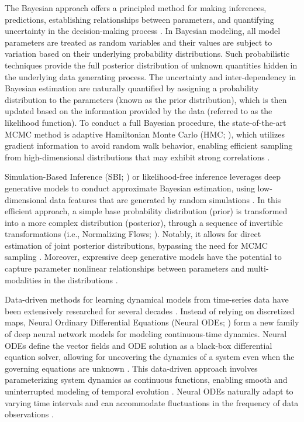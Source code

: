 \documentclass[preprint,11pt,authoryear]{elsarticle}
\begin{document}
The Bayesian approach offers a principled method for making inferences, predictions, establishing relationships between parameters, and quantifying uncertainty in the decision-making process \citep{BDA, Bishop, Gelman2020, VanSchoot2021}. In Bayesian modeling, all model parameters are treated as random variables and their values are subject to variation based on their underlying probability distributions. Such probabilistic techniques provide the full posterior distribution of unknown quantities hidden in the underlying data generating process. The uncertainty and inter-dependency in Bayesian estimation are naturally quantified by assigning a probability distribution to the parameters (known as the prior distribution), which is then updated based on the information provided by the data (referred to as the likelihood function). To conduct a full Bayesian procedure, the state-of-the-art MCMC method is adaptive Hamiltonian Monte Carlo (HMC; \cite{Duane1987, Neal2010, Hoffman2014}), which utilizes gradient information to avoid random walk behavior, enabling efficient sampling from high-dimensional distributions that may exhibit strong correlations \citep{Betancourt2017}.



Simulation-Based Inference (SBI; \cite{Cranmer2020, Brehmer2021}) or likelihood-free inference \citep{Papamakarios2016,  Brehmer2020} leverages deep generative models to conduct approximate Bayesian estimation, using low-dimensional data features that are generated by random simulations \citep{Goncalves2020, Lueckmann2021, Boelts2022}. In this efficient approach, a simple base probability distribution (prior) is transformed into a more complex distribution (posterior), through a sequence of invertible transformations (i.e., Normalizing Flows; \cite{Rezende2015, Papamakarios2019}). Notably, it allows for direct estimation of joint posterior distributions, bypassing the need for MCMC sampling \citep{Greenberg2019, Papamakarios2019b}. Moreover, expressive deep generative models have the potential to capture parameter nonlinear relationships between parameters and multi-modalities in the distributions \citep{Hashemi2023}.


Data-driven methods for learning dynamical models from time-series data have been extensively researched for several decades \citep{Juang1994, Ljung1998, Brunton2016, Linderman2017, Duncker2019, Koppe2019, Sip2023}.
Instead of relying on discretized maps, Neural Ordinary Differential Equations (Neural ODEs; \cite{Chen2018}) form a new family of deep neural network models for modeling continuous-time dynamics. Neural ODEs define the vector fields and ODE solution as a black-box differential equation solver, allowing for uncovering the dynamics of a system even when the governing equations are unknown \citep{Dupont2019, Bilovs2021}. This data-driven approach involves parameterizing system dynamics as continuous functions, enabling smooth and uninterrupted modeling of temporal evolution \citep{Yan2019, Kim2021}. Neural ODEs naturally adapt to varying time intervals and can accommodate fluctuations in the frequency of data observations \citep{Zhu2022, Goyal2023}.
\end{document}

